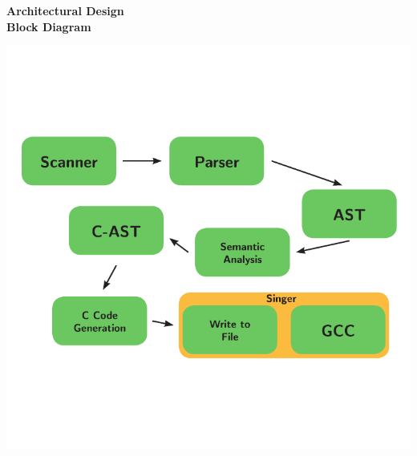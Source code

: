 \documentclass[11pt, oneside]{article}   	%
\begin{document}
\newpage
\LARGE\textbf{Architectural Design}\\[2em]
\normalsize
\Large\textbf{Block Diagram}\\[1em]
\normalsize
\centerline{\includegraphics[scale=1.2]{block.pdf}}
\end{document}
